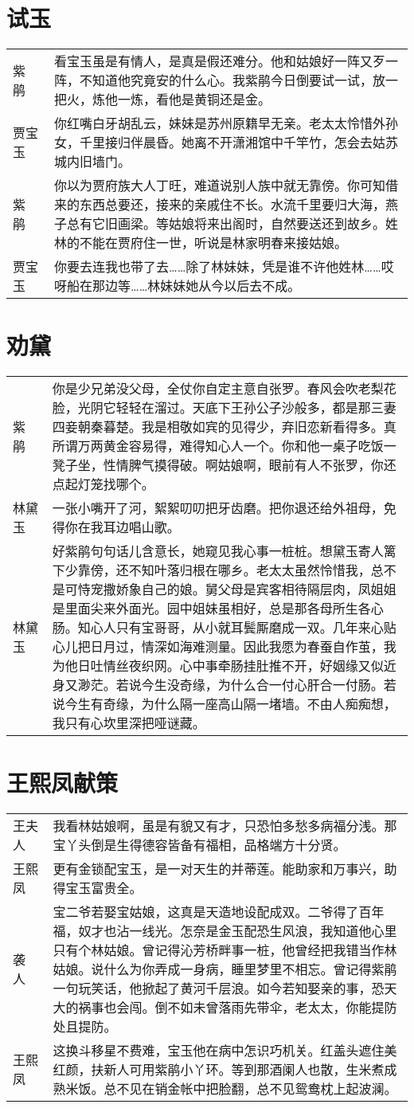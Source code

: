 \documentclass{article}
\newenvironment{lpar}{\vspace{-1ex}\begin{longtable}{lp{0.85\columnwidth}}}{\end{longtable}}
\newcommand\lver[2]{\vspace{1ex}#1&#2\\}
\begin{document}
\section{试玉}

\begin{lpar}
\lver{紫　鹃}{看宝玉虽是有情人，是真是假还难分。他和姑娘好一阵又歹一阵，不知道他究竟安的什么心。我紫鹃今日倒要试一试，放一把火，炼他一炼，看他是黄铜还是金。}
\lver{贾宝玉}{你红嘴白牙胡乱云，妹妹是苏州原籍早无亲。老太太怜惜外孙女，千里接归伴晨昏。她离不开潇湘馆中千竿竹，怎会去姑苏城内旧墙门。}
\lver{紫　鹃}{你以为贾府族大人丁旺，难道说别人族中就无靠傍。你可知借来的东西总要还，接来的亲戚住不长。水流千里要归大海，燕子总有它旧画梁。等姑娘将来出阁时，自然要送还到故乡。姓林的不能在贾府住一世，听说是林家明春来接姑娘。}
\lver{贾宝玉}{你要去连我也带了去……除了林妹妹，凭是谁不许他姓林……哎呀船在那边等……林妹妹她从今以后去不成。}
\end{lpar}

\section{劝黛}

\begin{lpar}
\lver{紫　鹃}{你是少兄弟没父母，全仗你自定主意自张罗。春风会吹老梨花脸，光阴它轻轻在溜过。天底下王孙公子沙般多，都是那三妻四妾朝秦暮楚。我是相敬如宾的见得少，弃旧恋新看得多。真所谓万两黄金容易得，难得知心人一个。你和他一桌子吃饭一凳子坐，性情脾气摸得破。啊姑娘啊，眼前有人不张罗，你还点起灯笼找哪个。}
\lver{林黛玉}{一张小嘴开了河，絮絮叨叨把牙齿磨。把你退还给外祖母，免得你在我耳边唱山歌。}
\lver{林黛玉}{好紫鹃句句话儿含意长，她窥见我心事一桩桩。想黛玉寄人篱下少靠傍，还不知叶落归根在哪乡。老太太虽然怜惜我，总不是可恃宠撒娇象自己的娘。舅父母是宾客相待隔层肉，凤姐姐是里面尖来外面光。园中姐妹虽相好，总是那各母所生各心肠。知心人只有宝哥哥，从小就耳鬓厮磨成一双。几年来心贴心儿把日月过，情深如海难测量。因此我愿为春蚕自作茧，我为他日吐情丝夜织网。心中事牵肠挂肚推不开，好姻缘又似近身又渺茫。若说今生没奇缘，为什么合一付心肝合一付肠。若说今生有奇缘，为什么隔一座高山隔一堵墙。不由人痴痴想，我只有心坎里深把哑谜藏。}
\end{lpar}

\section{王熙凤献策}

\begin{lpar}
\lver{王夫人}{我看林姑娘啊，虽是有貌又有才，只恐怕多愁多病福分浅。那宝丫头倒是生得德容皆备有福相，品格端方十分贤。}
\lver{王熙凤}{更有金锁配宝玉，是一对天生的并蒂莲。能助家和万事兴，助得宝玉富贵全。}
\lver{袭　人}{宝二爷若娶宝姑娘，这真是天造地设配成双。二爷得了百年福，奴才也沾一线光。怎奈是金玉配恐生风浪，我知道他心里只有个林姑娘。曾记得沁芳桥畔事一桩，他曾经把我错当作林姑娘。说什么为你弄成一身病，睡里梦里不相忘。曾记得紫鹃一句玩笑话，他掀起了黄河千层浪。如今若知娶亲的事，恐天大的祸事也会闯。倒不如未曾落雨先带伞，老太太，你能提防处且提防。}
\lver{王熙凤}{这换斗移星不费难，宝玉他在病中怎识巧机关。红盖头遮住美红颜，扶新人可用紫鹃小丫环。等到那酒阑人也散，生米煮成熟米饭。总不见在销金帐中把脸翻，总不见鸳鸯枕上起波澜。}
\end{lpar}
\end{document}
